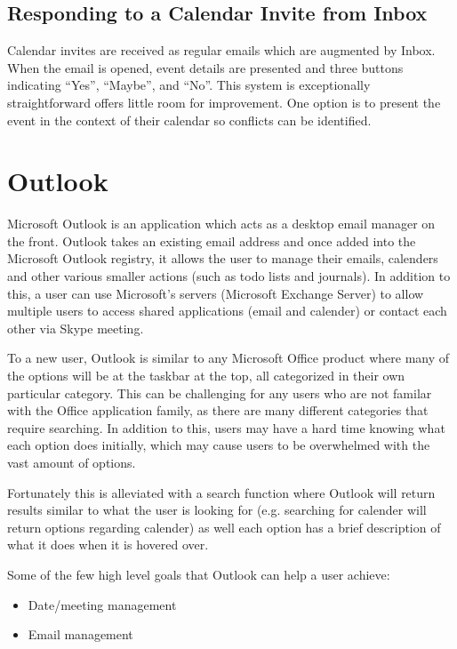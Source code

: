 \documentclass{sigchi}
\begin{document}
\subsection{Responding to a Calendar Invite from Inbox}
Calendar invites are received as regular emails which are augmented by Inbox.
When the email is opened, event details are presented and three buttons indicating ``Yes'', ``Maybe'', and ``No''.
This system is exceptionally straightforward offers little room for improvement.
One option is to present the event in the context of their calendar so conflicts can be identified.

\section{Outlook}

Microsoft Outlook is an application which acts as a desktop email manager on the front. 
Outlook takes an existing email address and once added into the Microsoft Outlook registry, it allows the user to manage their emails, calenders and other various smaller actions (such as todo lists and journals). 
In addition to this, a user can use Microsoft's servers (Microsoft Exchange Server) to allow multiple users to access shared applications (email and calender) or contact each other via Skype meeting.

To a new user, Outlook is similar to any Microsoft Office product where many of the options will be at the taskbar at the top, all categorized in their own particular category. 
This can be challenging for any users who are not familar with the Office application family, as there are many different categories that require searching. 
In addition to this, users may have a hard time knowing what each option does initially, which may cause users to be overwhelmed with the vast amount of options. 

Fortunately this is alleviated with a search function where Outlook will return results similar to what the user is looking for (e.g. searching for calender will return options regarding calender) as well each option has a brief description of what it does when it is hovered over.

Some of the few high level goals that Outlook can help a user achieve:
\begin{itemize}
	\item Date/meeting management
	\item Email management
\end{itemize}
\end{document}
